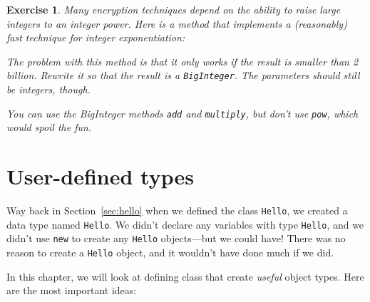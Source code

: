 \documentclass[12pt]{book}
\theoremstyle{exercise}
\newtheorem{exercise}{Exercise}[chapter]
\newcommand{\java}[1]{\verb"#1"}
\newcommand{\java}[1]{\lstinline{#1}} %
\begin{document}
\begin{exercise}
Many encryption techniques depend on the ability to raise large integers to an integer power.
Here is a method that implements a (reasonably) fast technique for integer exponentiation:


The problem with this method is that it only works if the result is smaller than 2 billion.
Rewrite it so that the result is a \java{BigInteger}.
The parameters should still be integers, though.

You can use the BigInteger methods \java{add} and \java{multiply}, but don't use \java{pow}, which would spoil the fun.
\end{exercise}


\chapter{User-defined types}


Way back in Section~\ref{sec:hello} when we defined the class \java{Hello}, we created a data type named \java{Hello}.
We didn't declare any variables with type \java{Hello}, and we didn't use \java{new} to create any \java{Hello} objects---but we could have!
There was no reason to create a \java{Hello} object, and it wouldn't have done much if we did.


In this chapter, we will look at defining class that create {\em useful} object types.
Here are the most important ideas:
\end{document}
